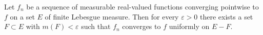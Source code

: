 Let $f_n$ be a sequence of measurable real-valued functions converging pointwise to $f$ on a set $E$ of finite Lebesgue measure. Then for every $\varepsilon > 0$ there exists a set $F \subset E$ with $m(F) < \varepsilon$ such that $f_n$ converges to $f$ uniformly on $E - F$.
